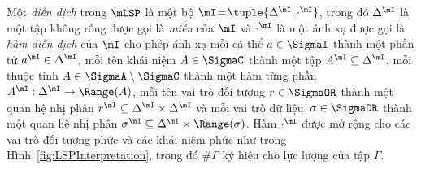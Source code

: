 \begin{Definition}
\label{def:LSPInterpretation}
Một {\em diễn dịch} trong $\mLSP$ là một bộ \mbox{$\mI\!=\! \tuple{\Delta^\mI, \cdot^\mI}$}, trong đó $\Delta^\mI$ là một tập không rỗng được gọi là {\em miền} của $\mI$ và $\cdot^\mI$ là một ánh xạ được gọi là {\em hàm diễn dịch} của $\mI$ cho phép ánh xạ mỗi cá thể $a \in \SigmaI$ thành một phần tử $a^\mI \in \Delta^\mI$, mỗi tên khái niệm $A \in \SigmaC$ thành một tập $A^\mI \subseteq \Delta^\mI$, mỗi thuộc tính $A \in \SigmaA \setminus \SigmaC$ thành một hàm từng phần $A^\mI : \Delta^\mI \to \Range(A)$, mỗi tên vai trò đối tượng $r \in \SigmaOR$ thành một quan hệ nhị phân $r^\mI \subseteq \Delta^\mI \times \Delta^\mI$ và mỗi vai trò dữ liệu~$\sigma \in \SigmaDR$ thành một quan hệ nhị phân $\sigma^\mI \subseteq \Delta^\mI \times \Range(\sigma)$.
Hàm $\cdot^\mI$ được mở rộng cho các vai trò đối tượng phức và các khái niệm phức như trong Hình~\ref{fig:LSPInterpretation}, trong đó $\#\Gamma$ ký hiệu cho lực lượng của tập $\Gamma$.\myend
\end{Definition}

